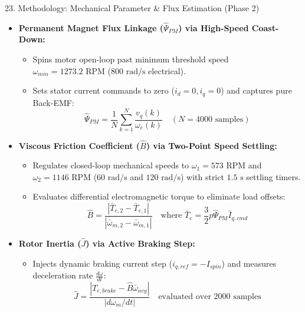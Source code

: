 \documentclass[aspectratio=169]{beamer}
\begin{document}
\begin{frame}{23. Methodology: Mechanical Parameter \& Flux Estimation (Phase 2)}
    \begin{itemize}
        \item \textbf{Permanent Magnet Flux Linkage ($\hat{\Psi}_{PM}$) via High-Speed Coast-Down:}
        \begin{itemize}
            \item Spins motor open-loop past minimum threshold speed $\omega_{min} = 1273.2\text{ RPM}$ ($800\text{ rad/s}$ electrical).
            \item Sets stator current commands to zero ($i_d = 0, i_q = 0$) and captures pure Back-EMF:
            \begin{equation}
                \hat{\Psi}_{PM} = \frac{1}{N}\sum_{k=1}^N \frac{v_q(k)}{\omega_e(k)} \quad (N = 4000\text{ samples})
            \end{equation}
        \end{itemize}
        \item \textbf{Viscous Friction Coefficient ($\hat{B}$) via Two-Point Speed Settling:}
        \begin{itemize}
            \item Regulates closed-loop mechanical speeds to $\omega_1 = 573\text{ RPM}$ and $\omega_2 = 1146\text{ RPM}$ ($60\text{ rad/s}$ and $120\text{ rad/s}$) with strict $1.5\text{ s}$ settling timers.
            \item Evaluates differential electromagnetic torque to eliminate load offsets:
            \begin{equation}
                \hat{B} = \frac{|\bar{T}_{e,2} - \bar{T}_{e,1}|}{|\bar{\omega}_{m,2} - \bar{\omega}_{m,1}|} \quad \text{where } \bar{T}_e = \frac{3}{2} p \hat{\Psi}_{PM} \bar{I}_{q,cmd}
            \end{equation}
        \end{itemize}
        \item \textbf{Rotor Inertia ($\hat{J}$) via Active Braking Step:}
        \begin{itemize}
            \item Injects dynamic braking current step ($i_{q,ref} = -I_{spin}$) and measures deceleration rate $\frac{d\omega}{dt}$:
            \begin{equation}
                \hat{J} = \frac{|T_{e,brake} - \hat{B}\bar{\omega}_{avg}|}{|d\omega_m/dt|} \quad \text{evaluated over 2000 samples}
            \end{equation}
        \end{itemize}
    \end{itemize}
\end{frame}
\end{document}

